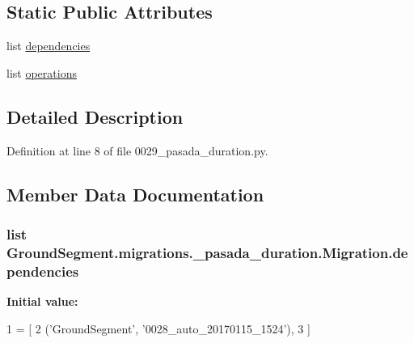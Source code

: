 \subsection*{Static Public Attributes}
\begin{DoxyCompactItemize}
\item 
list \hyperlink{class_ground_segment_1_1migrations_1_10029__pasada__duration_1_1_migration_ab5a2019b6ad6e84688e9a97a73f37914}{dependencies}
\item 
list \hyperlink{class_ground_segment_1_1migrations_1_10029__pasada__duration_1_1_migration_a30edd8ca1d10f051913bb824b42696af}{operations}
\end{DoxyCompactItemize}


\subsection{Detailed Description}


Definition at line 8 of file 0029\+\_\+pasada\+\_\+duration.\+py.



\subsection{Member Data Documentation}
\hypertarget{class_ground_segment_1_1migrations_1_10029__pasada__duration_1_1_migration_ab5a2019b6ad6e84688e9a97a73f37914}{}
\subsubsection[{dependencies}]{\setlength{\rightskip}{0pt plus 5cm}list Ground\+Segment.\+migrations.\+\_\+pasada\+\_\+duration.\+Migration.\+dependencies\hspace{0.3cm}{\ttfamily [static]}}\label{class_ground_segment_1_1migrations_1_10029__pasada__duration_1_1_migration_ab5a2019b6ad6e84688e9a97a73f37914}
{\bfseries Initial value\+:}
\begin{DoxyCode}
1 = [
2         (\textcolor{stringliteral}{'GroundSegment'}, \textcolor{stringliteral}{'0028\_auto\_20170115\_1524'}),
3     ]
\end{DoxyCode}


